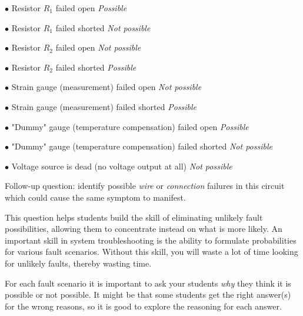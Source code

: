 \medskip
\item{$\bullet$} Resistor $R_1$ failed open {\it Possible}
\item{$\bullet$} Resistor $R_1$ failed shorted {\it Not possible}
\item{$\bullet$} Resistor $R_2$ failed open {\it Not possible}
\item{$\bullet$} Resistor $R_2$ failed shorted {\it Possible}
\item{$\bullet$} Strain gauge (measurement) failed open {\it Not possible}
\item{$\bullet$} Strain gauge (measurement) failed shorted {\it Possible}
\item{$\bullet$} "Dummy" gauge (temperature compensation) failed open {\it Possible}
\item{$\bullet$} "Dummy" gauge (temperature compensation) failed shorted {\it Not possible}
\item{$\bullet$} Voltage source is dead (no voltage output at all) {\it Not possible}
\medskip

\vskip 10pt

Follow-up question: identify possible {\it wire} or {\it connection} failures in this circuit which could cause the same symptom to manifest.







This question helps students build the skill of eliminating unlikely fault possibilities, allowing them to concentrate instead on what is more likely.  An important skill in system troubleshooting is the ability to formulate probabilities for various fault scenarios.  Without this skill, you will waste a lot of time looking for unlikely faults, thereby wasting time.

For each fault scenario it is important to ask your students {\it why} they think it is possible or not possible.  It might be that some students get the right answer(s) for the wrong reasons, so it is good to explore the reasoning for each answer.




